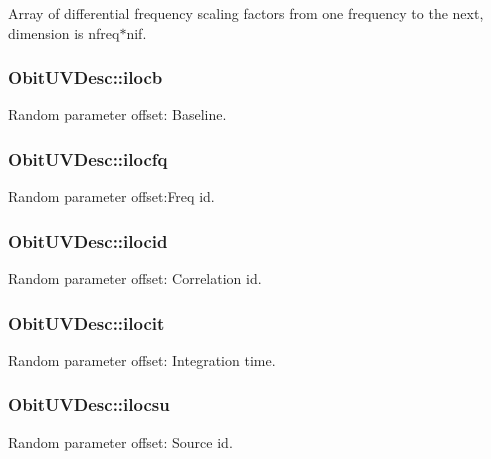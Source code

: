 Array of differential frequency scaling factors from one frequency to the next, dimension is nfreq$\ast$nif. 

\subsubsection{ {\bf Obit\-UVDesc::ilocb}}\label{structObitUVDesc_o54}


Random parameter offset: Baseline. 

\subsubsection{ {\bf Obit\-UVDesc::ilocfq}}\label{structObitUVDesc_o56}


Random parameter offset:Freq id. 

\subsubsection{ {\bf Obit\-UVDesc::ilocid}}\label{structObitUVDesc_o58}


Random parameter offset: Correlation id. 

\subsubsection{ {\bf Obit\-UVDesc::ilocit}}\label{structObitUVDesc_o57}


Random parameter offset: Integration time. 

\subsubsection{ {\bf Obit\-UVDesc::ilocsu}}\label{structObitUVDesc_o55}


Random parameter offset: Source id. 

